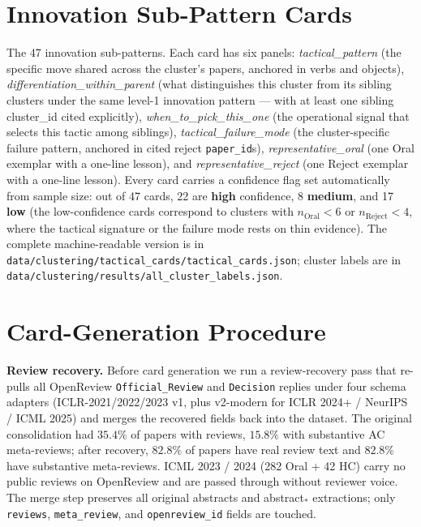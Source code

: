 \documentclass[10pt,a4paper]{article}
\begin{document}


\section{Innovation Sub-Pattern Cards}
\label{app:clusters}

The 47 innovation sub-patterns. Each card has six panels: \emph{tactical\_pattern} (the specific move shared across the cluster's papers, anchored in verbs and objects), \emph{differentiation\_within\_parent} (what distinguishes this cluster from its sibling clusters under the same level-1 innovation pattern --- with at least one sibling cluster\_id cited explicitly), \emph{when\_to\_pick\_this\_one} (the operational signal that selects this tactic among siblings), \emph{tactical\_failure\_mode} (the cluster-specific failure pattern, anchored in cited reject \texttt{paper\_id}s), \emph{representative\_oral} (one Oral exemplar with a one-line lesson), and \emph{representative\_reject} (one Reject exemplar with a one-line lesson). Every card carries a confidence flag set automatically from sample size: out of 47 cards, 22 are \textbf{high} confidence, 8 \textbf{medium}, and 17 \textbf{low} (the low-confidence cards correspond to clusters with $n_{\text{Oral}}{<}6$ or $n_{\text{Reject}}{<}4$, where the tactical signature or the failure mode rests on thin evidence). The complete machine-readable version is in \texttt{data/clustering/tactical\_cards/tactical\_cards.json}; cluster labels are in \texttt{data/clustering/results/all\_cluster\_labels.json}.



\section{Card-Generation Procedure}
\label{app:cards-method}

\textbf{Review recovery.} Before card generation we run a review-recovery pass that re-pulls all OpenReview \texttt{Official\_Review} and \texttt{Decision} replies under four schema adapters (ICLR-2021/2022/2023 v1, plus v2-modern for ICLR 2024+ / NeurIPS / ICML 2025) and merges the recovered fields back into the dataset. The original consolidation had $35.4\%$ of papers with reviews, $15.8\%$ with substantive AC meta-reviews; after recovery, $82.8\%$ of papers have real review text and $82.8\%$ have substantive meta-reviews. ICML 2023 / 2024 (282 Oral + 42 HC) carry no public reviews on OpenReview and are passed through without reviewer voice. The merge step preserves all original abstracts and abstract$_*$ extractions; only \texttt{reviews}, \texttt{meta\_review}, and \texttt{openreview\_id} fields are touched.
\end{document}
